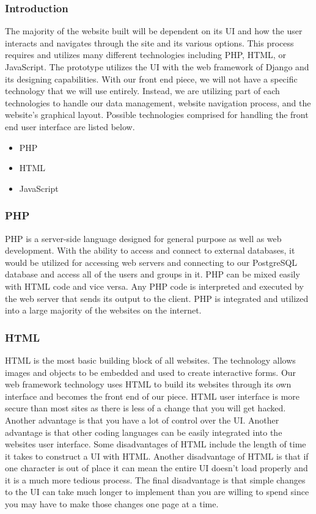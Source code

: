\documentclass[draftclsnofoot,10pt,onecolumn]{IEEEtran} %
\begin{document}
\subsubsection{Introduction}
The majority of the website built will be dependent on its UI and how the user interacts and navigates through the site and its
various options. This process requires and utilizes many different technologies including PHP, HTML, or JavaScript. The
prototype utilizes the UI with the web framework of Django and its designing capabilities. With our front end piece, we will
not have a specific technology that we will use entirely. Instead, we are utilizing part of each technologies to handle our data
management, website navigation process, and the website’s graphical layout. Possible technologies comprised for handling
the front end user interface are listed below. \\

	\begin{itemize}
		\item PHP
		\item HTML
		\item JavaScript \\
	\end{itemize}
	
\subsubsection{PHP}
PHP is a server-side language designed for general purpose as well as web development. With the ability to access and
connect to external databases, it would be utilized for accessing web servers and connecting to our PostgreSQL database and
access all of the users and groups in it. PHP can be mixed easily with HTML code and vice versa. Any PHP code is
interpreted and executed by the web server that sends its output to the client. PHP is integrated and utilized into a large
majority of the websites on the internet. \\

\subsubsection{HTML}
HTML is the most basic building block of all websites. The technology allows images and objects to be embedded and used
to create interactive forms. Our web framework technology uses HTML to build its websites through its own interface and
becomes the front end of our piece. HTML user interface is more secure than most sites as there is less of a change that you
will get hacked. Another advantage is that you have a lot of control over the UI. Another advantage is that other coding
languages can be easily integrated into the websites user interface. Some disadvantages of HTML include the length of time
it takes to construct a UI with HTML. Another disadvantage of HTML is that if one character is out of place it can mean the
entire UI doesn't load properly and it is a much more tedious process. The final disadvantage is that simple changes to the UI
can take much longer to implement than you are willing to spend since you may have to make those changes one page at a
time. \\
\end{document}
